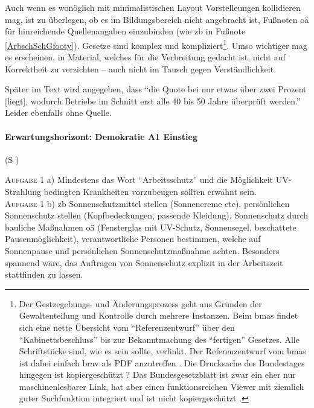 Auch wenn es wonöglich mit minimalistischen Layout Vorstelleungen kollidieren mag, ist zu überlegen, ob es im Bildungsbereich nicht angebracht ist, Fußnoten \gls{oä} für hinreichende Quellenangaben einzubinden (wie \gls{zb} in Fußnote \ref{ArbschSchGfooty}). 
Gesetze sind komplex und kompliziert\footnote{
    Der Gestzegebungs- und Änderungsprozess geht aus Gründen der Gewaltenteilung und Kontrolle durch mehrere Instanzen. 
    Beim \gls{bmas} findet sich eine nette Übersicht vom \enquote{Referenzentwurf} über den \enquote{Kabinettsbeschluss} bis zur Bekanntmachung des \enquote{fertigen} Gesetzes.
    Alle Schriftstücke sind, wie es sein sollte, verlinkt. Der Referenzentwurf vom \gls{bmas} ist dabei einfach brav als PDF anzutreffen \autocite{BMAS-21.07.2020}. 
    Die Drucksache des Bundestages hingegen ist kopiergeschützt \autocite{Bundestag.31.08.2020}?
    Das Bundesgesetzblatt ist zwar ein eher nur maschinenlesbarer Link, hat aber einen funktionsreichen Viewer mit ziemlich guter Suchfunktion integriert und ist nicht kopiergeschützt \autocite{BGBl.2020-I-Nr67}.
}. Umso wichtiger mag es erscheinen, in Material, welches für die Verbreitung gedacht ist, nicht auf Korrektheit zu verzichten -- auch nicht im Tausch gegen Verständlichkeit.

Später im Text wird angegeben, dass \enquote{die Quote bei nur etwas über zwei Prozent [liegt], wodurch Betriebe im Schnitt erst alle 40 bis 50 Jahre überprüft werden.} Leider ebenfalls ohne Quelle.



\paragraph{Erwartungshorizont: Demokratie A1 Einstieg} (\gls{S} \pageref{DEMOKRATIE-A1})

\textsc{Aufgabe 1} a) \quad
Mindestens das Wort \enquote{Arbeitsschutz} und die Möglichkeit UV-Strahlung bedingten Krankheiten vorzubeugen sollten erwähnt sein. 
\\

\textsc{Aufgabe 1} b) \quad
\Gls{zb} Sonnenschutzmittel stellen (Sonnencreme \gls{etc}), persönlichen Sonnenschutz stellen (Kopfbedeckungen, passende Kleidung), Sonnenschutz durch bauliche Maßnahmen \gls{oä} (Fensterglas mit UV-Schutz, Sonnensegel, beschattete Pausenmöglichkeit), verantwortliche Personen bestimmen, welche auf Sonnenpause und persönlichen Sonnenschutzmaßnahme achten. 
Besonders spannend wäre, das Auftragen von Sonnenschutz explizit in der Arbeitszeit stattfinden zu lassen. 
\\

